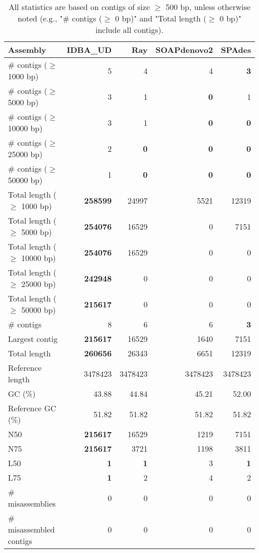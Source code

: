 \documentclass[12pt,a4paper]{article}
\begin{document}
\begin{table}[ht]
\begin{center}
\caption{All statistics are based on contigs of size $\geq$ 500 bp, unless otherwise noted (e.g., "\# contigs ($\geq$ 0 bp)" and "Total length ($\geq$ 0 bp)" include all contigs).}
\begin{tabular}{|l*{4}{|r}|}
\hline
Assembly & IDBA\_UD & Ray & SOAPdenovo2 & SPAdes \\ \hline
\# contigs ($\geq$ 1000 bp) & 5 & 4 & 4 & {\bf 3} \\ \hline
\# contigs ($\geq$ 5000 bp) & 3 & 1 & {\bf 0} & 1 \\ \hline
\# contigs ($\geq$ 10000 bp) & 3 & 1 & {\bf 0} & {\bf 0} \\ \hline
\# contigs ($\geq$ 25000 bp) & 2 & {\bf 0} & {\bf 0} & {\bf 0} \\ \hline
\# contigs ($\geq$ 50000 bp) & 1 & {\bf 0} & {\bf 0} & {\bf 0} \\ \hline
Total length ($\geq$ 1000 bp) & {\bf 258599} & 24997 & 5521 & 12319 \\ \hline
Total length ($\geq$ 5000 bp) & {\bf 254076} & 16529 & 0 & 7151 \\ \hline
Total length ($\geq$ 10000 bp) & {\bf 254076} & 16529 & 0 & 0 \\ \hline
Total length ($\geq$ 25000 bp) & {\bf 242948} & 0 & 0 & 0 \\ \hline
Total length ($\geq$ 50000 bp) & {\bf 215617} & 0 & 0 & 0 \\ \hline
\# contigs & 8 & 6 & 6 & {\bf 3} \\ \hline
Largest contig & {\bf 215617} & 16529 & 1640 & 7151 \\ \hline
Total length & {\bf 260656} & 26343 & 6651 & 12319 \\ \hline
Reference length & 3478423 & 3478423 & 3478423 & 3478423 \\ \hline
GC (\%) & 43.88 & 44.84 & 45.21 & 52.00 \\ \hline
Reference GC (\%) & 51.82 & 51.82 & 51.82 & 51.82 \\ \hline
N50 & {\bf 215617} & 16529 & 1219 & 7151 \\ \hline
N75 & {\bf 215617} & 3721 & 1198 & 3811 \\ \hline
L50 & {\bf 1} & {\bf 1} & 3 & {\bf 1} \\ \hline
L75 & {\bf 1} & 2 & 4 & 2 \\ \hline
\# misassemblies & 0 & 0 & 0 & 0 \\ \hline
\# misassembled contigs & 0 & 0 & 0 & 0 \\ \hline

\end{tabular}
\end{center}
\end{table}
\end{document}
